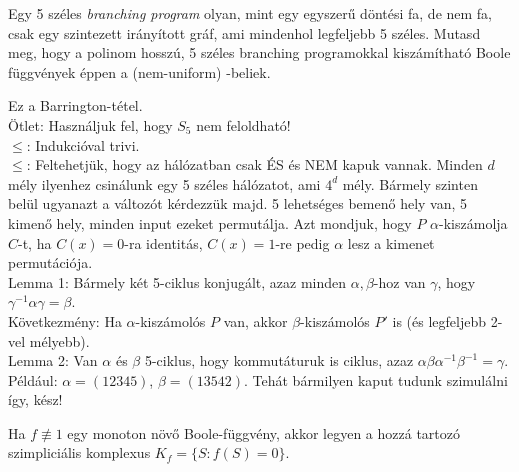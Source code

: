 \begin{Exercise}[counter={sorszam}, difficulty=2]
	Egy 5 sz\'eles \emph{branching program} olyan, mint egy egyszer\H u d\"ont\'esi fa, de nem fa, csak egy szintezett ir\'any\'itott gr\'af, ami mindenhol legfeljebb 5 sz\'eles.
	Mutasd meg, hogy a polinom hossz\'u, 5 sz\'eles branching programokkal kisz\'am\'ithat\'o Boole f\"uggv\'enyek \'eppen a (nem-uniform) \NCone-beliek.
\end{Exercise}
\begin{Answer}
	Ez a Barrington-t\'etel.\\
	\"Otlet: Haszn\'aljuk fel, hogy $S_5$ nem feloldhat\'o!\\
	$\le$: Indukci\'oval trivi.\\
	$\le$: Feltehetj\"uk, hogy az \NCone h\'al\'ozatban csak \'ES \'es NEM kapuk vannak.
	Minden $d$ m\'ely ilyenhez csin\'alunk egy 5 sz\'eles h\'al\'ozatot, ami $4^d$ m\'ely.
	B\'armely szinten bel\"ul ugyanazt a v\'altoz\'ot k\'erdezz\"uk majd.
	5 lehets\'eges bemen\H o hely van, 5 kimen\H o hely, minden input ezeket permut\'alja.
	Azt mondjuk, hogy $P$ $\alpha$-kisz\'amolja $C$-t, ha $C(x)=0$-ra identit\'as, $C(x)=1$-re pedig $\alpha$ lesz a kimenet permut\'aci\'oja.\\
	Lemma 1: B\'armely k\'et 5-ciklus konjug\'alt, azaz minden $\alpha,\beta$-hoz van $\gamma$, hogy $\gamma^{-1}\alpha\gamma=\beta$.\\
	K\"ovetkezm\'eny: Ha $\alpha$-kisz\'amol\'os $P$ van, akkor $\beta$-kisz\'amol\'os $P'$ is (\'es legfeljebb 2-vel m\'elyebb).\\
	Lemma 2: Van $\alpha$ \'es $\beta$ 5-ciklus, hogy kommut\'aturuk is ciklus,
	azaz $\alpha\beta\alpha^{-1}\beta^{-1}=\gamma$.
	P\'eld\'aul: $\alpha= (1 2 3 4 5)$, $\beta = (1 3 5 4 2)$.
	Teh\'at b\'armilyen kaput tudunk szimul\'alni \'igy, k\'esz!
\end{Answer}

\bigskip
{} Ha $f\not\equiv 1$ egy monoton n\"ov\H o Boole-f\"uggv\'eny, akkor legyen a hozz\'a tartoz\'o szimplici\'alis komplexus $K_f=\{S: f(S)=0\}$.

